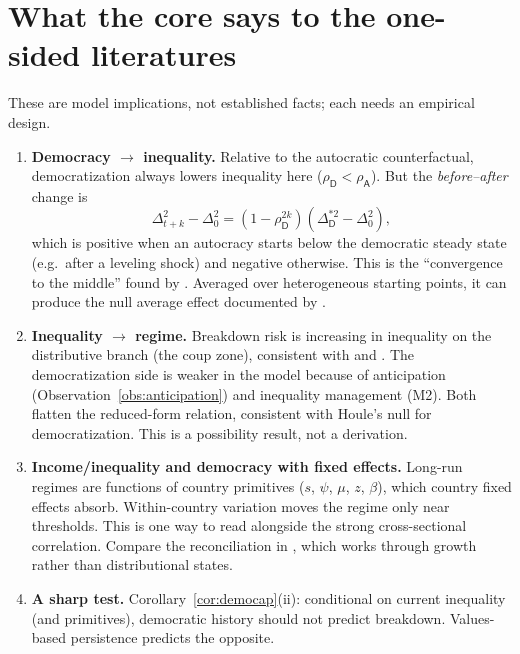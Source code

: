 \documentclass[11pt]{article}
\theoremstyle{remark}
\newcommand{\A}{\mathsf{A}}
\newcommand{\D}{\mathsf{D}}
\begin{document}
\section{What the core says to the one-sided literatures}\label{sec:empirics}

These are model implications, not established facts; each needs an empirical design.

\begin{enumerate}
\item \textbf{Democracy $\to$ inequality.}  Relative to the autocratic counterfactual, democratization always lowers inequality here ($\rho_\D<\rho_\A$).  But the \emph{before--after} change is
\[
\Delta^2_{t+k}-\Delta^2_0=(1-\rho_\D^{2k})(\Delta^{*2}_\D-\Delta^2_0),
\]
which is positive when an autocracy starts below the democratic steady state (e.g.\ after a leveling shock) and negative otherwise.  This is the ``convergence to the middle'' found by \citet{DorschMaarek2019}.  Averaged over heterogeneous starting points, it can produce the null average effect documented by \citet{AcemogluEtAl2015Handbook}.
\item \textbf{Inequality $\to$ regime.}  Breakdown risk is increasing in inequality on the distributive branch (the coup zone), consistent with \citet{Houle2009} and \citet{RauStokes2024}.  The democratization side is weaker in the model because of anticipation (Observation~\ref{obs:anticipation}) and inequality management (M2).  Both flatten the reduced-form relation, consistent with Houle's null for democratization.  This is a possibility result, not a derivation.
\item \textbf{Income/inequality and democracy with fixed effects.}  Long-run regimes are functions of country primitives ($s$, $\psi$, $\mu$, $z$, $\beta$), which country fixed effects absorb.  Within-country variation moves the regime only near thresholds.  This is one way to read \citet{AcemogluEtAl2008} alongside the strong cross-sectional correlation.  Compare the reconciliation in \citet{CervellatiEtAl2025}, which works through growth rather than distributional states.
\item \textbf{A sharp test.}  Corollary~\ref{cor:democap}(ii): conditional on current inequality (and primitives), democratic history should not predict breakdown.  Values-based persistence predicts the opposite.
\end{enumerate}
\end{document}
